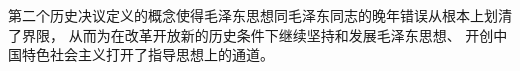 \documentclass{ctexart}
\begin{document}
第二个历史决议定义的概念使得毛泽东思想同毛泽东同志的晚年错误从根本上划清了界限，
从而为在改革开放新的历史条件下继续坚持和发展毛泽东思想、
开创中国特色社会主义打开了指导思想上的通道。

\nocite{*}
\printbibliography[heading=bibliography,title=参考文献]
\end{document}
